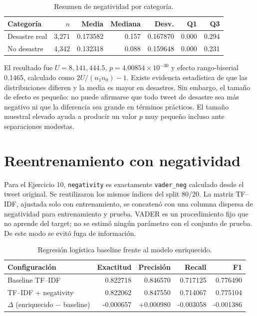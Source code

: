 \documentclass[11pt,letterpaper]{article}
\newcommand{\code}[1]{\texttt{#1}}
\begin{document}
\begin{table}[H]
\centering
\caption{Resumen de negatividad por categoría.}
\label{tab:negatividad}
\begin{tabular}{@{}lrrrrrr@{}}
\toprule
Categoría & $n$ & Media & Mediana & Desv. & Q1 & Q3 \\
\midrule
Desastre real & 3,271 & 0.173582 & 0.157 & 0.167870 & 0.000 & 0.294 \\
No desastre & 4,342 & 0.132318 & 0.088 & 0.159648 & 0.000 & 0.231 \\
\bottomrule
\end{tabular}
\end{table}

El resultado fue $U=8{,}141{,}444.5$, $p=4.00854\times10^{-30}$ y efecto rango-biserial 0.1465, calculado como $2U/(n_1n_0)-1$. Existe evidencia estadística de que las distribuciones difieren y la media es mayor en desastres. Sin embargo, el tamaño de efecto es pequeño: no puede afirmarse que todo tweet de desastre sea más negativo ni que la diferencia sea grande en términos prácticos. El tamaño muestral elevado ayuda a producir un valor $p$ muy pequeño incluso ante separaciones modestas.

\section{Reentrenamiento con negatividad}

Para el Ejercicio 10, \code{negativity} es exactamente \code{vader\_neg} calculado desde el tweet original. Se reutilizaron los mismos índices del split 80/20. La matriz TF--IDF, ajustada solo con entrenamiento, se concatenó con una columna dispersa de negatividad para entrenamiento y prueba. VADER es un procedimiento fijo que no aprende del target; no se estimó ningún parámetro con el conjunto de prueba. De este modo se evitó fuga de información.

\begin{table}[H]
\centering
\caption{Regresión logística baseline frente al modelo enriquecido.}
\label{tab:neg-modelo}
\begin{tabular}{@{}lrrrr@{}}
\toprule
Configuración & Exactitud & Precisión & Recall & F1 \\
\midrule
Baseline TF--IDF & 0.822718 & 0.846570 & 0.717125 & 0.776490 \\
TF--IDF + negativity & 0.822062 & 0.847550 & 0.714067 & 0.775104 \\
\midrule
$\Delta$ (enriquecido $-$ baseline) & -0.000657 & +0.000980 & -0.003058 & -0.001386 \\
\bottomrule
\end{tabular}
\end{table}
\end{document}
